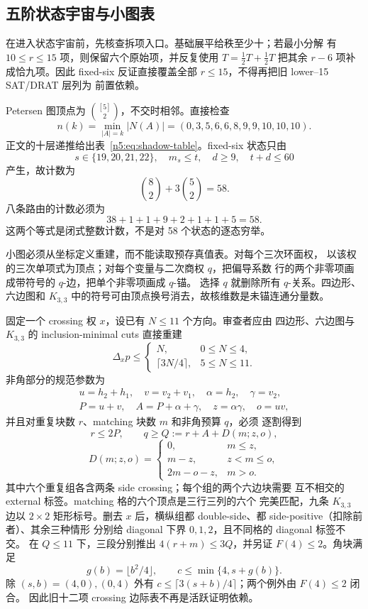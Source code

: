 \subsection{五阶状态宇宙与小图表}

在进入状态宇宙前，先核查拆项入口。基础展平给秩至少十；若最小分解
有 \(10\le r\le15\) 项，则保留六个原始项，并反复使用
\(T=\frac12T+\frac12T\) 把其余 \(r-6\) 项补成恰九项。因此 fixed-six
反证直接覆盖全部 \(r\le15\)，不得再把旧 lower--15 SAT/DRAT 层列为
前置依赖。

Petersen 图顶点为 \(\binom{[5]}2\)，不交时相邻。直接检查
\[
n(k)=\min_{|A|=k}|N(A)|
=(0,3,5,6,6,8,9,9,10,10,10).
\]
正文的十层递推给出表~\eqref{n5:eq:shadow-table}。fixed-six 状态只由
\[
s\in\{19,20,21,22\},\quad m_s\le t,\quad d\ge9,\quad t+d\le60
\]
产生，故计数为
\[
\binom82+3\binom52=58.
\]
八条路由的计数必须为
\[
38+1+1+9+2+1+1+5=58.
\]
这两个等式是闭式整数计数，不是对 58 个状态的逐态穷举。

小图必须从坐标定义重建，而不能读取预存真值表。对每个三次环面权，
以该权的三次单项式为顶点；对每个变量与二次商权 \(q\)，把偏导系数
行的两个非零项画成带符号的 \(q\)-边，把单个非零项画成 \(q\)-锚。
选择 \(q\) 就删除所有 \(q\)-关系。四边形、六边图和 \(K_{3,3}\)
中的符号可由顶点换号消去，故核维数是未锚连通分量数。

固定一个 crossing 权 \(x\)，设已有 \(N\le11\) 个方向。审查者应由
四边形、六边图与 \(K_{3,3}\) 的 inclusion-minimal cuts 直接重建
\[
\Delta_xp\le
\begin{cases}
N,&0\le N\le4,\\
\lceil3N/4\rceil,&5\le N\le11.
\end{cases}
\]
非角部分的规范参数为
\[
\begin{gathered}
u=h_2+h_1,\quad v=v_2+v_1,\quad
\alpha=h_2,\quad\gamma=v_2,\\
P=u+v,\quad A=P+\alpha+\gamma,\quad
z=\alpha\gamma,\quad o=uv,
\end{gathered}
\]
并且对重复块数 \(r\)、matching 块数 \(m\) 和非角预算 \(q\)，必须
逐割得到
\[
r\le2P,\qquad q\ge Q:=r+A+D(m;z,o),
\]
\[
D(m;z,o)=
\begin{cases}
0,&m\le z,\\
m-z,&z<m\le o,\\
2m-o-z,&m>o.
\end{cases}
\]
其中六个重复组各含两条 side crossing；每个组的两个六边块需要
互不相交的 external 标签。matching 格的六个顶点是三行三列的六个
完美匹配，九条 \(K_{3,3}\) 边以 \(2\times2\) 矩形标号。删去
\(x\) 后，横纵组都 double-side、都 side-positive（扣除前者）、其余三种情形
分别给 diagonal 下界 \(0,1,2\)，且不同格的 diagonal 标签不交。
在 \(Q\le11\) 下，三段分别推出 \(4(r+m)\le3Q\)，并另证
\(F(4)\le2\)。角块满足
\[
g(b)=\lfloor b^2/4\rfloor,\qquad
c\le\min\{4,s+g(b)\}.
\]
除 \((s,b)=(4,0),(0,4)\) 外有
\(c\le\lceil3(s+b)/4\rceil\)；两个例外由 \(F(4)\le2\) 闭合。
因此旧十二项 crossing 边际表不再是活跃证明依赖。

